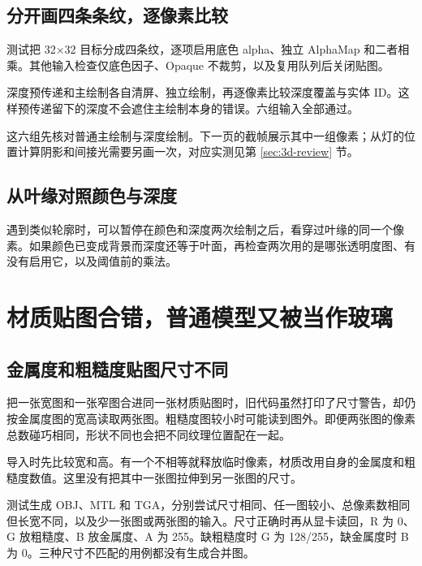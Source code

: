 \subsection{分开画四条条纹，逐像素比较}
测试把 32×32 目标分成四条纹，逐项启用底色 alpha、独立 AlphaMap 和二者相乘。其他输入检查仅底色因子、Opaque 不裁剪，以及复用队列后关闭贴图。

深度预传递和主绘制各自清屏、独立绘制，再逐像素比较深度覆盖与实体 ID。这样预传递留下的深度不会遮住主绘制本身的错误。六组输入全部通过。

这六组先核对普通主绘制与深度绘制。下一页的截帧展示其中一组像素；从灯的位置计算阴影和间接光需要另画一次，对应实测见第 \ref{sec:3d-review} 节。


\subsection{从叶缘对照颜色与深度}
遇到类似轮廓时，可以暂停在颜色和深度两次绘制之后，看穿过叶缘的同一个像素。如果颜色已变成背景而深度还等于叶面，再检查两次用的是哪张透明度图、有没有启用它，以及阈值前的乘法。

\newpage


\newpage
\section{材质贴图合错，普通模型又被当作玻璃}
\subsection{金属度和粗糙度贴图尺寸不同}
把一张宽图和一张窄图合进同一张材质贴图时，旧代码虽然打印了尺寸警告，却仍按金属度图的宽高读取两张图。粗糙度图较小时可能读到图外。即便两张图的像素总数碰巧相同，形状不同也会把不同纹理位置配在一起。

导入时先比较宽和高。有一个不相等就释放临时像素，材质改用自身的金属度和粗糙度数值。这里没有把其中一张图拉伸到另一张图的尺寸。

测试生成 OBJ、MTL 和 TGA，分别尝试尺寸相同、任一图较小、总像素数相同但长宽不同，以及少一张图或两张图的输入。尺寸正确时再从显卡读回，R 为 0、G 放粗糙度、B 放金属度、A 为 255。缺粗糙度时 G 为 128/255，缺金属度时 B 为 0。三种尺寸不匹配的用例都没有生成合并图。

